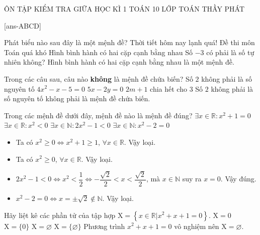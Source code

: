 \begin{name}
	{ÔN TẬP KIỂM TRA GIỮA HỌC KÌ 1}
	{TOÁN 10}
	{LỚP TOÁN THẦY PHÁT}
	{\thoigian}
\end{name}

\caulc

[ans-ABCD]

\begin{ex}%
	Phát biểu nào sau đây là một mệnh đề? 
	\choice
	{Thời tiết hôm nay lạnh quá!}
	{Đề thi môn Toán quá khó}
	{\True Hình bình hành có hai cặp cạnh bằng nhau}
	{Số $-3$ có phải là số tự nhiên không?}
	\loigiai
	{ Hình bình hành có hai cặp cạnh bằng nhau là một mệnh đề.
	}
\end{ex}

\begin{ex}%
	Trong các câu sau, câu nào \textbf{không} là mệnh đề chứa biến? 
	\choice
	{\True Số $2$ không phải là số nguyên tố}
	{$4x^2-x-5=0$}
	{$5x-2y=0$}
	{$2m+1$ chia hết cho $3$}
	\loigiai
	{Số $2$ không phải là số nguyên tố không phải là mệnh đề chứa biến.
	}
\end{ex}

\begin{ex}%
	Trong các mệnh đề dưới đây, mệnh đề nào là mệnh đề đúng?  
	\choice
	{$\exists x \in \mathbb{R} \colon x^2+1=0$}
	{$\exists x \in \mathbb{R} \colon x^2<0$}
	{\True $\exists x \in \mathbb{N} \colon 2x^2-1<0$}
	{$\exists x \in \mathbb{N} \colon x^2-2=0$}
	\loigiai
	{
		\begin{itemize}
			\item Ta có $x^2 \geq 0 \Leftrightarrow x^2 +1 \geq 1$, $\forall x \in \mathbb{R}$. Vậy loại.
			\item Ta có $x^2 \geq 0$, $\forall x \in \mathbb{R}$. Vậy loại.
			\item $2x^2-1<0 \Leftrightarrow x^2<\dfrac{1}{2} \Leftrightarrow -\dfrac{\sqrt{2}}{2}<x<\dfrac{\sqrt{2}}{2}$, mà $x \in \mathbb{N}$ suy ra $x=0$. Vậy đúng.
			\item $x^2 -2=0 \Leftrightarrow x=\pm \sqrt{2} \notin \mathbb{N}$. Vậy loại.
		\end{itemize}
	}
\end{ex}

\begin{ex}%
	Hãy liệt kê các phần tử của tập hợp $\mathrm{X}=\left\{x \in \mathbb{R}|x^2+x+1=0\right\}$.
	\choice
	{$\mathrm{X}=0$}
	{$\mathrm{X}=\{0\}$}
	{\True $\mathrm{X}=\varnothing$}
	{$\mathrm{X}=\{\varnothing\}$}
	\loigiai
	{
		Phương trình $x^2+x+1=0$ vô nghiệm nên $\mathrm{X}=\varnothing$.
	}
\end{ex}

